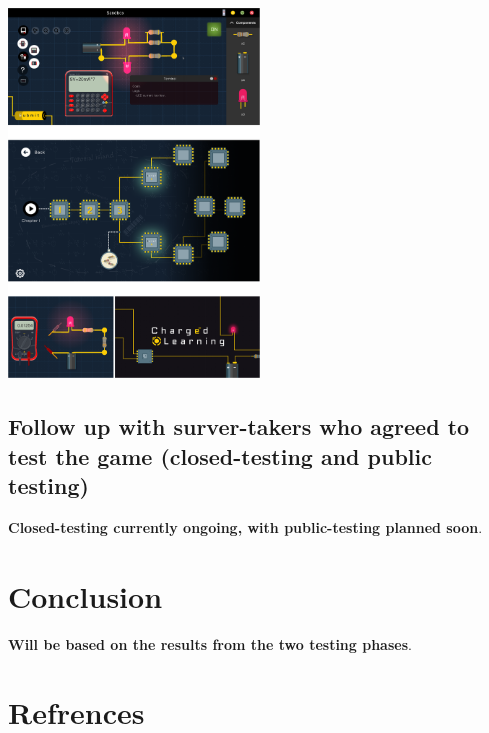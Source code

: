 \documentclass[twoside,a4paper,11pt]{article}
\begin{document}
\begin{multicols}{2}
\begin{itemize}
\end{itemize}
\begin{center}
    \includegraphics[width=0.5\textwidth]{images/game_screenshots.png}
\end{center}


\subsection{Follow up with surver-takers who agreed to test the game (closed-testing and public testing)}
 \textbf{Closed-testing currently ongoing, with public-testing planned soon}. \lipsum*[3]

 \section{Conclusion}
\textbf{Will be based on the results from the two testing phases}. \lipsum*[3]
\section{Refrences}
\printbibliography
\end{multicols}
\end{document}
